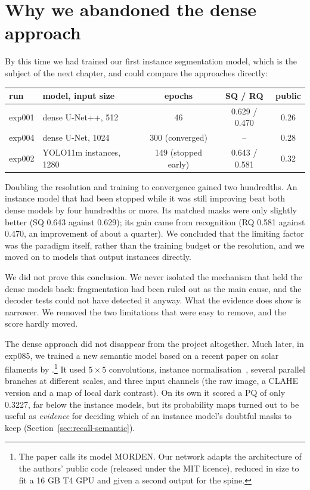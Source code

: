 \section{Why we abandoned the dense approach}\label{sec:paradigms-stop}
By this time we had trained our first instance segmentation model, which is the subject of the next
chapter, and could compare the approaches directly:
\begin{center}\small
\setlength{\tabcolsep}{4pt}
\begin{tabular}{@{}llccc@{}}
\toprule
run & model, input size & epochs & SQ / RQ & public \\
\midrule
exp001 & dense U-Net++, 512 & 46 & 0.629 / 0.470 & 0.26 \\
exp004 & dense U-Net, 1024 & 300 (converged) & -- & 0.28 \\
exp002 & YOLO11m instances, 1280 & 149 (stopped early) & 0.643 / 0.581 & 0.32 \\
\bottomrule
\end{tabular}
\end{center}
Doubling the resolution and training to convergence gained two hundredths. An instance model that
had been stopped while it was still improving beat both dense models by four hundredths or more.
Its matched masks were only slightly better (SQ 0.643 against 0.629); its gain came from recognition
(RQ 0.581 against 0.470, an improvement of about a quarter). We concluded that the limiting factor
was the paradigm itself, rather than the training budget or the resolution, and we moved on to
models that output instances directly.

We did not prove this conclusion. We never isolated the
mechanism that held the dense models back: fragmentation had been ruled out as the main cause, and
the decoder tests could not have detected it anyway. What the evidence does show is narrower. We
removed the two limitations that were easy to remove, and the score hardly moved.

The dense approach did not disappear from the project altogether. Much later, in exp085, we trained
a new semantic model based on a recent paper on solar filaments by
\citet{hu2026morden}.\footnote{The paper calls its model MORDEN. Our network adapts the
architecture of the authors' public code (released under the MIT licence), reduced in size to fit a
16 GB T4 GPU and given a second output for the spine.} It used $5\times5$ convolutions, instance
normalisation~\citep{ulyanov2016}, several parallel
branches at different scales, and three input channels (the raw image, a CLAHE version and a map of
local dark contrast). On its own it scored a PQ of only 0.3227, far below the instance models, but
its probability maps turned out to be useful as \emph{evidence} for deciding which of an instance
model's doubtful masks to keep (Section~\ref{sec:recall-semantic}).

